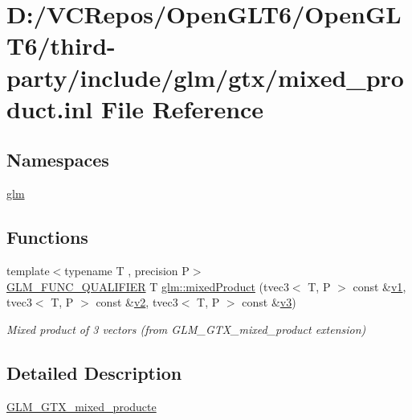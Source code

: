 \hypertarget{mixed__product_8inl}{}\section{D\+:/\+V\+C\+Repos/\+Open\+G\+L\+T6/\+Open\+G\+L\+T6/third-\/party/include/glm/gtx/mixed\+\_\+product.inl File Reference}
\label{mixed__product_8inl}
\subsection*{Namespaces}
\begin{DoxyCompactItemize}
\item 
 \mbox{\hyperlink{namespaceglm}{glm}}
\end{DoxyCompactItemize}
\subsection*{Functions}
\begin{DoxyCompactItemize}
\item 
{\footnotesize template$<$typename T , precision P$>$ }\\\mbox{\hyperlink{setup_8hpp_a33fdea6f91c5f834105f7415e2a64407}{G\+L\+M\+\_\+\+F\+U\+N\+C\+\_\+\+Q\+U\+A\+L\+I\+F\+I\+ER}} T \mbox{\hyperlink{group__gtx__mixed__product_gaaee4cf80d69cb86de80f12af88b3c3af}{glm\+::mixed\+Product}} (tvec3$<$ T, P $>$ const \&\mbox{\hyperlink{glad_8h_a0779c3b73f9aa3a0ac5b0139b5d291d9}{v1}}, tvec3$<$ T, P $>$ const \&\mbox{\hyperlink{glad_8h_a9a09a1837922b2b806f4589096a52049}{v2}}, tvec3$<$ T, P $>$ const \&\mbox{\hyperlink{glad_8h_acc806b31cbf466ceba6555983d8b814d}{v3}})
\begin{DoxyCompactList}\small\item\em Mixed product of 3 vectors (from G\+L\+M\+\_\+\+G\+T\+X\+\_\+mixed\+\_\+product extension) \end{DoxyCompactList}\end{DoxyCompactItemize}


\subsection{Detailed Description}
\mbox{\hyperlink{group__gtx__mixed__product}{G\+L\+M\+\_\+\+G\+T\+X\+\_\+mixed\+\_\+producte}} 